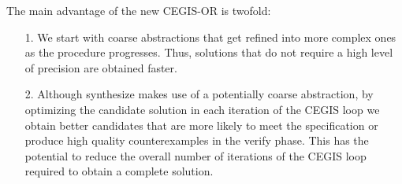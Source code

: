 \documentclass[sigconf]{llncs}
\begin{document}
The main advantage of the new CEGIS-OR is twofold:
\begin{itemize}
\item[1.] We start with coarse abstractions that get
  refined into more complex ones as the procedure progresses. Thus, solutions
  that do not require a high level of precision are obtained faster. 
\item[2.] Although {\sc synthesize} makes use of a potentially coarse abstraction,
  by optimizing the candidate solution in each iteration of the CEGIS loop
  we obtain better candidates that are more likely to meet the
  specification or produce high quality counterexamples in the
  {\sc verify} phase.
  This has the potential to reduce
  the overall number of iterations of the CEGIS loop required to obtain a complete solution.
\end{itemize}
  


\end{document}

